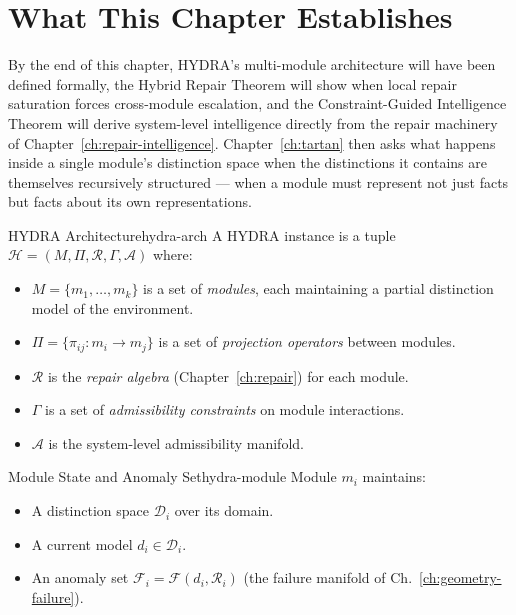 \documentclass[12pt,twoside,openright]{book}
\newcommand{\adm}{\mathcal{A}}
\begin{document}
\section{What This Chapter Establishes}
\label{sec:ch25-preview}

By the end of this chapter, HYDRA's multi-module architecture
will have been defined formally, the Hybrid Repair Theorem
will show when local repair saturation forces cross-module
escalation, and the Constraint-Guided Intelligence Theorem will
derive system-level intelligence directly from the repair
machinery of Chapter~\ref{ch:repair-intelligence}.
Chapter~\ref{ch:tartan} then asks what happens inside a single
module's distinction space when the distinctions it contains
are themselves recursively structured --- when a module must
represent not just facts but facts about its own
representations.

\begin{definition}{HYDRA Architecture}{hydra-arch}
  A HYDRA instance is a tuple
  $\mathcal{H} = (M, \Pi, \mathcal{R}, \Gamma, \adm)$
  where:
  \begin{itemize}[nosep]
    \item $M = \{m_1, \ldots, m_k\}$ is a set of
          \emph{modules}, each maintaining a partial
          distinction model of the environment.
    \item $\Pi = \{\pi_{ij} : m_i \to m_j\}$ is a set
          of \emph{projection operators} between modules.
    \item $\mathcal{R}$ is the \emph{repair algebra}
          (Chapter~\ref{ch:repair}) for each module.
    \item $\Gamma$ is a set of \emph{admissibility
          constraints} on module interactions.
    \item $\adm$ is the system-level admissibility
          manifold.
  \end{itemize}
\end{definition}

\begin{definition}{Module State and Anomaly Set}{hydra-module}
  Module $m_i$ maintains:
  \begin{itemize}[nosep]
    \item A distinction space $\mathcal{D}_i$ over its
          domain.
    \item A current model $d_i \in \mathcal{D}_i$.
    \item An anomaly set
          $\mathcal{F}_i = \mathcal{F}(d_i, \mathcal{R}_i)$
          (the failure manifold of Ch.~\ref{ch:geometry-failure}).
  \end{itemize}
\end{definition}
\end{document}
